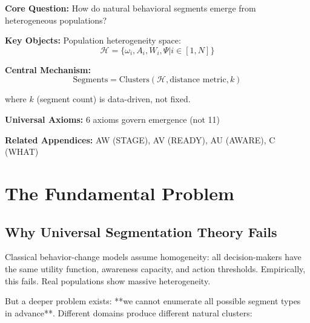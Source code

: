 
\begin{tcolorbox}[colback=blue!5!white, colframe=blue!75!black,
    title=Quick Reference: Segmentation Genesis]

\textbf{Core Question:} How do natural behavioral segments emerge from
heterogeneous populations?

\textbf{Key Objects:}
Population heterogeneity space:
\begin{equation}
\mathcal{H} = \{\omega_i, A_i, W_i, \Psi | i \in [1,N]\}
\end{equation}

\textbf{Central Mechanism:}
\begin{equation}
\text{Segments} = \text{Clusters}(\mathcal{H}, \text{distance metric}, k)
\end{equation}

where $k$ (segment count) is data-driven, not fixed.

\textbf{Universal Axioms:} 6 axioms govern emergence (not 11)

\textbf{Related Appendices:} AW (STAGE), AV (READY), AU (AWARE), C (WHAT)

\end{tcolorbox}

\section{The Fundamental Problem}
\label{sec:ba-fundamental}

\subsection{Why Universal Segmentation Theory Fails}

Classical behavior-change models assume homogeneity: all decision-makers have
the same utility function, awareness capacity, and action thresholds. Empirically,
this fails. Real populations show massive heterogeneity.

But a deeper problem exists: **we cannot enumerate all possible segment types
in advance**. Different domains produce different natural clusters:

